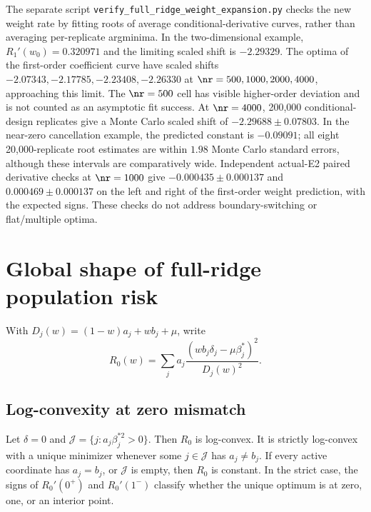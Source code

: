 The separate script \texttt{verify\_full\_ridge\_weight\_expansion.py} checks the new weight rate by fitting roots of average conditional-derivative curves, rather than averaging per-replicate argminima. In the two-dimensional example, $R_1'(w_0)=0.320971$ and the limiting scaled shift is $-2.29329$. The optima of the first-order coefficient curve have scaled shifts $-2.07343,-2.17785,-2.23408,-2.26330$ at $\nr=500,1000,2000,4000$, approaching this limit. The $\nr=500$ cell has visible higher-order deviation and is not counted as an asymptotic fit success. At $\nr=4000$, 200{,}000 conditional-design replicates give a Monte Carlo scaled shift of $-2.29688\pm0.07803$. In the near-zero cancellation example, the predicted constant is $-0.09091$; all eight 20{,}000-replicate root estimates are within $1.98$ Monte Carlo standard errors, although these intervals are comparatively wide. Independent actual-E2 paired derivative checks at $\nr=1000$ give $-0.000435\pm0.000137$ and $0.000469\pm0.000137$ on the left and right of the first-order weight prediction, with the expected signs. These checks do not address boundary-switching or flat/multiple optima.

\section{Global shape of full-ridge population risk}
\label{supp:globalshape}

With $D_j(w)=(1-w)a_j+wb_j+\mu$, write
\begin{equation}
 R_0(w)=\sum_j a_j\frac{(wb_j\delta_j-\mu\beta_j^*)^2}{D_j(w)^2}.
 \label{supp:eq:r0-global}
\end{equation}

\subsection{Log-convexity at zero mismatch}

\begin{proposition}\label{supp:prop:delta-zero-shape}
Let $\delta=0$ and $\mathcal J=\{j:a_j\beta_j^{*2}>0\}$. Then $R_0$ is log-convex. It is strictly log-convex with a unique minimizer whenever some $j\in\mathcal J$ has $a_j\ne b_j$. If every active coordinate has $a_j=b_j$, or $\mathcal J$ is empty, then $R_0$ is constant. In the strict case, the signs of $R_0'(0^+)$ and $R_0'(1^-)$ classify whether the unique optimum is at zero, one, or an interior point.
\end{proposition}

